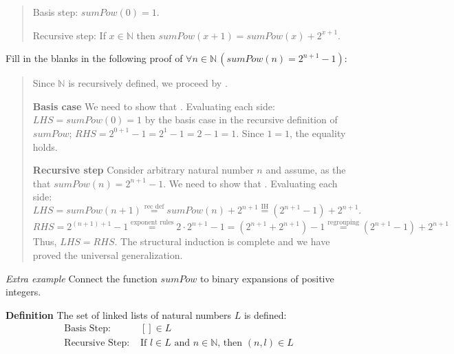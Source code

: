 \documentclass[12pt, oneside]{article}
\begin{document}
\begin{quote}
Basis step: $sumPow(0) = 1$.

Recursive step: If $x \in \mathbb{N}$ then $sumPow(x+1) = sumPow(x) + 2^{x+1}$.
\end{quote}

\vfill



Fill in the blanks in the following proof of $\forall n \in \mathbb{N} \, (sumPow(n) = 2^{n+1} - 1)$:

\vspace{-20pt}

\begin{quote}
Since $\mathbb{N}$ is recursively defined, we proceed by \underline{}.

{\bf Basis case} We need to show that \underline{}.
Evaluating each side: $LHS = sumPow(0) = 1$ by the basis case in the recursive definition
of $sumPow$; $RHS = 2^{0+1} - 1 = 2^1 - 1 = 2-1 = 1$. Since $1=1$, the equality holds.

{\bf Recursive step} Consider arbitrary natural number $n$ and assume, as the 
\underline{\phantom{Induction Hypothesis (IH)}} that $sumPow(n) = 2^{n+1} - 1$. We need to show that
\underline{}.  Evaluating each side: 
\[
LHS = sumPow(n+1) \overset{\text{rec def}}{=} sumPow(n)  + 2^{n+1}\overset{\text{IH}}{=} (2^{n+1} - 1) + 2^{n+1}.
\]
\[
RHS = 2^{(n+1)+1}- 1 \overset{\text{exponent rules}}{=} 2 \cdot 2^{n+1} -1  = \left(2^{n+1} + 2^{n+1} \right) - 1
\overset{\text{regrouping}}{=}  (2^{n+1} - 1) + 2^{n+1} 
\]
Thus, $LHS = RHS$. The structural induction is complete and we have proved the universal generalization.
\end{quote}



\vfill
{\it Extra example} Connect the function $sumPow$ to binary expansions of positive integers.

\newpage
{\bf Definition} The set of linked lists of natural numbers $L$ is defined:
\[
\begin{array}{ll}
    \textrm{Basis Step: } & [] \in L \\
    \textrm{Recursive Step: } & \textrm{If } l \in L\textrm{ and }n \in \mathbb{N} \textrm{, then } (n, l) \in L
\end{array}
\]
\end{document}
